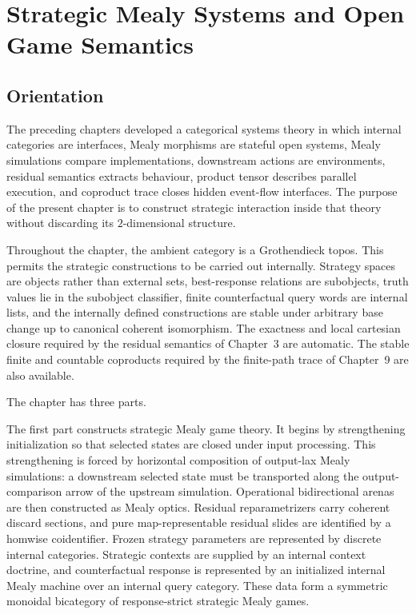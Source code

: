 \chapter{Strategic Mealy Systems and Open Game Semantics}
\label{chap:strategic-mealy-games}

\section{Orientation}
\label{sec:strategic-mealy-orientation}

The preceding chapters developed a categorical systems theory in which internal categories are
interfaces, Mealy morphisms are stateful open systems, Mealy simulations compare implementations,
downstream actions are environments, residual semantics extracts behaviour, product tensor describes
parallel execution, and coproduct trace closes hidden event-flow interfaces. The purpose of the
present chapter is to construct strategic interaction inside that theory without discarding its
\(2\)-dimensional structure.

Throughout the chapter, the ambient category is a Grothendieck topos. This permits the strategic
constructions to be carried out internally. Strategy spaces are objects rather than external sets,
best-response relations are subobjects, truth values lie in the subobject classifier, finite
counterfactual query words are internal lists, and the internally defined constructions are stable
under arbitrary base change up to canonical coherent isomorphism. The exactness and local cartesian
closure required by the residual semantics of Chapter~3 are automatic. The stable finite and
countable coproducts required by the finite-path trace of Chapter~9 are also available.

The chapter has three parts.

The first part constructs strategic Mealy game theory. It begins by strengthening initialization so
that selected states are closed under input processing. This strengthening is forced by horizontal
composition of output-lax Mealy simulations: a downstream selected state must be transported along
the output-comparison arrow of the upstream simulation. Operational bidirectional arenas are then
constructed as Mealy optics. Residual reparametrizers carry coherent discard sections, and pure
map-representable residual slides are identified by a homwise coidentifier. Frozen strategy
parameters are represented by discrete internal categories. Strategic contexts are supplied by an
internal context doctrine, and counterfactual response is represented by an initialized internal
Mealy machine over an internal query category. These data form a symmetric monoidal bicategory of
response-strict strategic Mealy games.

